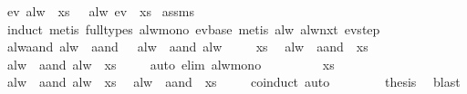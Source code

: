 \begin{isabellebody}
\ {\isachardoublequoteopen}ev\ {\isacharparenleft}alw\ {\isasymphi}{\isacharparenright}\ xs{\isachardoublequoteclose}\ \ \ {\isachardoublequoteopen}alw\ {\isacharparenleft}ev\ {\isasymphi}{\isacharparenright}\ xs{\isachardoublequoteclose}\isanewline
%
\isadelimproof
%
\endisadelimproof
%
\isatagproof
{}\isamarkupfalse%
\ assms\ \isamarkupfalse%
\ induct\ {\isacharparenleft}metis\ {\isacharparenleft}full{\isacharunderscore}types{\isacharparenright}\ alw{\isacharunderscore}mono\ ev{\isachardot}base{\isacharcomma}\ metis\ alw\ alw{\isacharunderscore}nxt\ ev{\isachardot}step{\isacharparenright}%
\endisatagproof
{\isafoldproof}%
%
\isadelimproof
\isanewline
%
\endisadelimproof
\isanewline
{}\isamarkupfalse%
\ alw{\isacharunderscore}aand{\isacharcolon}\ {\isachardoublequoteopen}alw\ {\isacharparenleft}{\isasymphi}\ aand\ {\isasympsi}{\isacharparenright}\ {\isacharequal}\ alw\ {\isasymphi}\ aand\ alw\ {\isasympsi}{\isachardoublequoteclose}\isanewline
%
\isadelimproof
%
\endisadelimproof
%
\isatagproof
{}\isamarkupfalse%
{\isacharminus}\isanewline
\ \ \isacommand{{\isacharbraceleft}}\isamarkupfalse%
\isamarkupfalse%
\ xs\ \isamarkupfalse%
\ {\isachardoublequoteopen}alw\ {\isacharparenleft}{\isasymphi}\ aand\ {\isasympsi}{\isacharparenright}\ xs{\isachardoublequoteclose}\ \isamarkupfalse%
\ {\isachardoublequoteopen}{\isacharparenleft}alw\ {\isasymphi}\ aand\ alw\ {\isasympsi}{\isacharparenright}\ xs{\isachardoublequoteclose}\isanewline
\ \ \ \isamarkupfalse%
\ {\isacharparenleft}auto\ elim{\isacharcolon}\ alw{\isacharunderscore}mono{\isacharparenright}\isanewline
\ \ \isacommand{{\isacharbraceright}}\isamarkupfalse%
\isanewline
\ \ \isamarkupfalse%
\isanewline
\ \ \isacommand{{\isacharbraceleft}}\isamarkupfalse%
\isamarkupfalse%
\ xs\ \isamarkupfalse%
\ {\isachardoublequoteopen}{\isacharparenleft}alw\ {\isasymphi}\ aand\ alw\ {\isasympsi}{\isacharparenright}\ xs{\isachardoublequoteclose}\ \isamarkupfalse%
\ {\isachardoublequoteopen}alw\ {\isacharparenleft}{\isasymphi}\ aand\ {\isasympsi}{\isacharparenright}\ xs{\isachardoublequoteclose}\isanewline
\ \ \ \isamarkupfalse%
\ coinduct\ auto\isanewline
\ \ \isacommand{{\isacharbraceright}}\isamarkupfalse%
\isanewline
\ \ \isamarkupfalse%
\ \isamarkupfalse%
\ {\isacharquery}thesis\ \isamarkupfalse%
\ blast\isanewline

\end{isabellebody}
